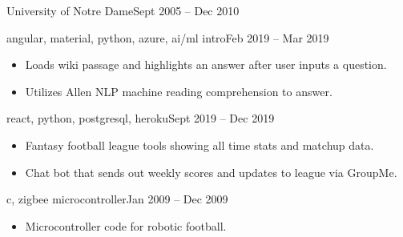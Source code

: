  {University of Notre Dame}{Sept 2005 -- Dec 2010 \hspace{1 cm}}{}

\smallskip
{}


\smallskip
{}
{\MakeLowercase{Angular, Material, Python, Azure, AI/ML Intro}}{Feb 2019 -- Mar 2019}{}
\begin{itemize}
\item Loads wiki passage and highlights an answer after user inputs a question.
\item Utilizes Allen NLP machine reading comprehension to answer.
\end{itemize}

\divider

{\MakeLowercase{react, python, postgresql, heroku}}{Sept 2019 -- Dec 2019}{}
\begin{itemize}
\item  Fantasy football league tools showing all time stats and matchup data.
\item  Chat bot that sends out weekly scores and updates to league via GroupMe.
\end{itemize}

\divider

{\MakeLowercase{C, ZigBee Microcontroller}}{Jan 2009 -- Dec 2009}{}
\begin{itemize}
\item  Microcontroller code for robotic football.
\end{itemize}
